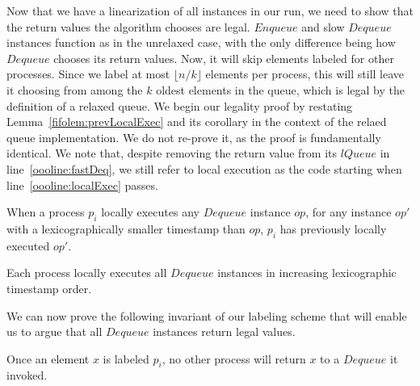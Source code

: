 \documentclass[a4paper,anonymous,USenglish]{lipics-v2021}
\theoremstyle{definition}
\begin{document}

Now that we have a linearization of all instances in our run, we need to show that the return values the algorithm chooses are legal.  $Enqueue$ and slow $Dequeue$ instances function as in the unrelaxed case, with the only difference being how $Dequeue$ chooses its return values.  Now, it will skip elements labeled for other processes.  Since we label at most $\lfloor n/k\rfloor$ elements per process, this will still leave it choosing from among the $k$ oldest elements in the queue, which is legal by the definition of a relaxed queue.  We begin our legality proof by restating Lemma~\ref{fifolem:prevLocalExec} and its corollary in the context of the relaed queue implementation.  We do not re-prove it, as the proof is fundamentally identical.  We note that, despite removing the return value from its $lQueue$ in line~\ref{oooline:fastDeq}, we still refer to local execution as the code starting when line~\ref{oooline:localExec} passes.

\begin{lemma}
  When a process $p_i$ locally executes any $Dequeue$ instance $op$, for any instance $op'$ with a lexicographically smaller timestamp than $op$, $p_i$ has previously locally executed $op'$.
\end{lemma}

\begin{corollary}\label{ooolem:localExecOrder}
  Each process locally executes all $Dequeue$ instances in increasing lexicographic timestamp order.
\end{corollary}

We can now prove the following invariant of our labeling scheme that will enable us to argue that all $Dequeue$ instances return legal values.

\begin{lemma}\label{ooolem:labelOwner}
  Once an element $x$ is labeled $p_i$, no other process will return $x$ to a $Dequeue$ it invoked.
\end{lemma}
\end{document}
